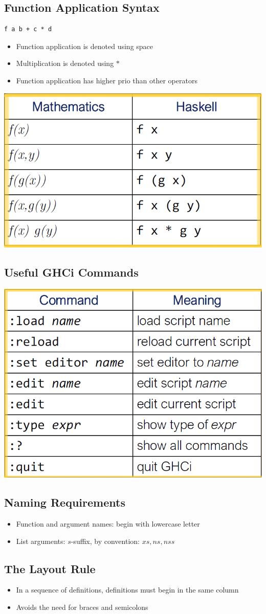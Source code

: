 \subsection{Function Application Syntax}
\begin{lstlisting}
f a b + c * d
\end{lstlisting}
\begin{itemize}
    \item Function application is denoted using space
    \item Multiplication is denoted using $*$
    \item Function application has higher prio than other operators
\end{itemize}
\includegraphics[width=0.6\linewidth]{img/function_application_syntax.png}\\

\subsection{Useful GHCi Commands}
\includegraphics[width=0.6\linewidth]{img/ghci_commands.png}\\

\subsection{Naming Requirements}
\begin{itemize}
    \item Function and argument names: begin with lowercase letter
    \item List arguments: $s$-suffix, by convention: $xs, ns, nss$
\end{itemize}

\subsection{The Layout Rule}
\begin{itemize}
    \item In a sequence of definitions, definitions must begin in the same column
    \item Avoids the need for braces and semicolons
\end{itemize}














